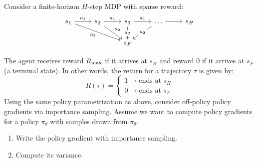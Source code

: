 \documentclass{article}
\begin{document}
\begin{enumerate}
\begin{enumerate}
\end{enumerate}
\newpage
{} Consider a finite-horizon $H$-step MDP with sparse reward:
\[\begin{tikzcd}
	{s_1} & {s_2} & {s_3} & \dots & {s_H} \\
	&& {s_F}
	\arrow["{a_1}", from=1-1, to=1-2]
	\arrow["{a_1}", from=1-2, to=1-3]
	\arrow["{a_2}"', from=1-1, to=2-3]
	\arrow["{a_1}", from=1-3, to=1-4]
	\arrow[from=1-4, to=1-5]
	\arrow["{a_2}", from=1-2, to=2-3]
	\arrow["{a_2}"{description}, from=1-3, to=2-3]
	\arrow["{a_2}"{description}, from=1-4, to=2-3]
\end{tikzcd}\]

The agent receives reward $R_{\textrm{max}}$ if it arrives at $s_H$ and reward $0$ if it arrives at $s_F$ (a terminal state). In other words, the return for a trajectory $\tau$ is given by:
\[R(\tau) = \begin{cases}1 & \tau \textrm{ ends at } s_H \\ 0 & \tau \textrm{ ends at } s_F \end{cases}\]
Using the same policy parametrization as above, consider off-policy policy gradients via importance sampling. Assume we want to compute policy gradients for a policy $\pi_\theta$ with samples drawn from $\pi_{\theta'}$.
\begin{enumerate}
    \item Write the policy gradient with importance sampling.

    \item Compute its variance.

\end{enumerate}

\end{enumerate}
\end{document}

